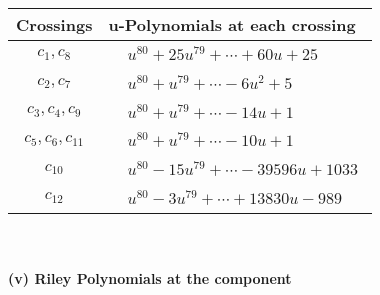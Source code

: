 \documentclass[1p]{elsarticle_modified}
\theoremstyle{definition}
\begin{document}
\begin{tabular}{m{50pt}|m{274pt}}
Crossings & \hspace{64pt}u-Polynomials at each crossing \\
\hline $$\begin{aligned}c_{1},c_{8}\end{aligned}$$&$\begin{aligned}
&u^{80}+25 u^{79}+\cdots+60 u+25
\end{aligned}$\\
\hline $$\begin{aligned}c_{2},c_{7}\end{aligned}$$&$\begin{aligned}
&u^{80}+u^{79}+\cdots-6 u^2+5
\end{aligned}$\\
\hline $$\begin{aligned}c_{3},c_{4},c_{9}\end{aligned}$$&$\begin{aligned}
&u^{80}+u^{79}+\cdots-14 u+1
\end{aligned}$\\
\hline $$\begin{aligned}c_{5},c_{6},c_{11}\end{aligned}$$&$\begin{aligned}
&u^{80}+u^{79}+\cdots-10 u+1
\end{aligned}$\\
\hline $$\begin{aligned}c_{10}\end{aligned}$$&$\begin{aligned}
&u^{80}-15 u^{79}+\cdots-39596 u+1033
\end{aligned}$\\
\hline $$\begin{aligned}c_{12}\end{aligned}$$&$\begin{aligned}
&u^{80}-3 u^{79}+\cdots+13830 u-989
\end{aligned}$\\
\hline
\end{tabular}\\~\\
\newpage\renewcommand{\arraystretch}{1}
\flushleft \textbf{(v) Riley Polynomials at the component}\newline \\
\end{document}
